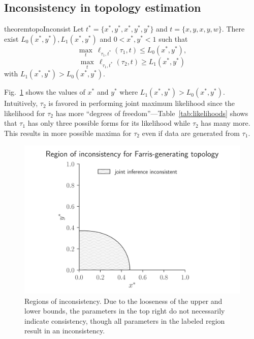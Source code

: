 \documentclass{article}
\begin{document}
\subsection*{Inconsistency in topology estimation}

\begin{restatable}{theorem}{topoInconsist}
Let $t^*=\{x^*, y^*, x^*, y^*, y^*\}$ and $t=\{x, y, x, y, w\}$.
There exist $L_0(x^*, y^*), L_1(x^*, y^*)$ and $0 < x^*, y^* < 1$ such that
$$
\max_{t} \ \ell_{\tau_1,t^*}(\tau_1, t) \le L_0(x^*, y^*),
$$
$$
\max_{t} \ \ell_{\tau_1,t^*}(\tau_2, t) \ge L_1(x^*, y^*)
$$
with $L_1(x^*, y^*) > L_0(x^*, y^*)$.
\end{restatable}
Fig.~\ref{fig:inconsistency-farris} shows the values of $x^*$ and $y^*$ where $L_1(x^*, y^*) > L_0(x^*, y^*)$.
Intuitively, $\tau_2$ is favored in performing joint maximum likelihood since the likelihood for $\tau_2$ has more ``degrees of freedom''---Table~\ref{tab:likelihoods} shows that $\tau_1$ has only three possible forms for its likelihood while $\tau_2$ has many more.
This results in more possible maxima for $\tau_2$ even if data are generated from $\tau_1$.

\begin{figure}
\centering
\includegraphics[width=\textwidth]{topology-inconsistency-inkscape}
\caption{
    Regions of inconsistency.
    Due to the looseness of the upper and lower bounds, the parameters in the top right do not necessarily indicate consistency, though all parameters in the labeled region result in an inconsistency.
}
\label{fig:inconsistency-farris}
\end{figure}
\end{document}
